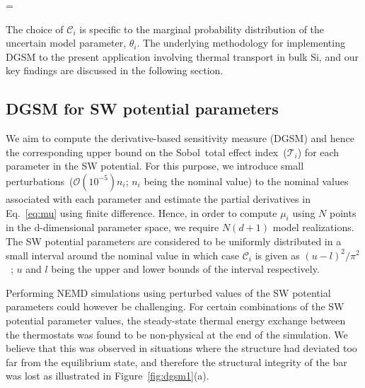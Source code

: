 \be
{} =  
\ee

\noindent The choice of $\mathcal{C}_i$ is specific to the marginal probability distribution of the uncertain model
parameter, $\theta_i$. 
The underlying methodology for implementing DGSM to the present application involving thermal transport in bulk Si,
and our key findings are discussed in the following section. 

\subsection{DGSM for SW potential parameters}
\label{sub:dgsm} 

We aim to compute the derivative-based sensitivity measure (DGSM) and hence the corresponding upper bound on the
Sobol\textquotesingle~total effect index~($\mathcal{T}_i$) for each parameter in the SW potential. For this purpose, we 
introduce small perturbations~($\mathcal{O}(10^{-5})n_i$; $n_i$ being the nominal value) to the nominal values
associated with each parameter and estimate the partial derivatives in Eq.~\ref{eq:mu} using finite difference. 
Hence, in order to compute $\mu_i$ using $N$ points in the d-dimensional parameter space, we require $N(d+1)$
model realizations. The SW potential parameters are considered to be uniformly distributed in a small interval
around the nominal value in which case $\mathcal{C}_i$ is given as $(u-l)^{2}/\pi^2$~\cite{Roustant:2014}; $u$
and $l$ being the upper and lower bounds of the interval respectively.   

Performing NEMD simulations using perturbed values of the SW potential parameters could however be challenging.
For certain combinations of the SW potential parameter values, the steady-state thermal
energy exchange between the thermostats was found to be non-physical at the end of the simulation. We believe that
this was observed in situations 
where the structure had deviated too far from the equilibrium state, and therefore the
structural integrity of the bar was lost as illustrated in Figure~\ref{fig:dgsm1}(a). 

